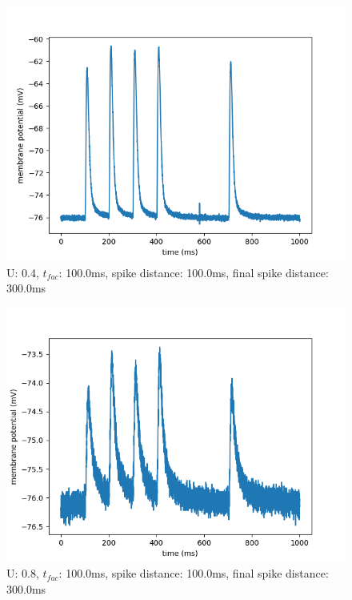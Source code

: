 \documentclass[10pt,a4paper]{scrartcl}
\begin{document}
\begin{figure} [ht]
\begin{center}
\label{fig:abb27}
\caption{U: 0.4, $t_{fac}$: 100.0ms, spike distance: 100.0ms, final spike distance: 300.0ms}
\includegraphics[scale=0.35]{pictures/final_spike_variation_17.pdf} 
\end{center}
\end{figure}

\begin{figure} [ht]
\begin{center}
\label{fig:abb28}
\caption{U: 0.8, $t_{fac}$: 100.0ms, spike distance: 100.0ms, final spike distance: 300.0ms}
\includegraphics[scale=0.35]{pictures/final_spike_variation_18.pdf} 
\end{center}
\end{figure}
\end{document}
